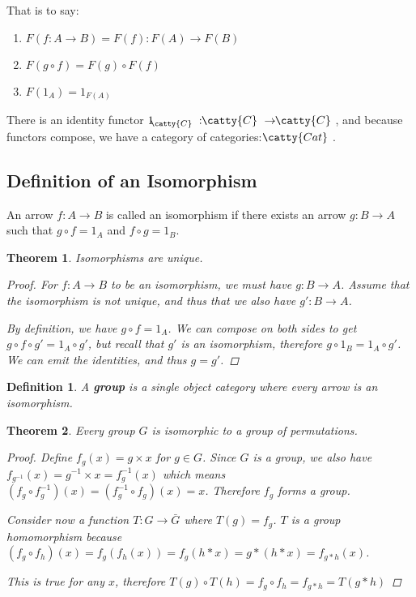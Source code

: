 \documentclass[]{article}
\newtheorem{theorem}{Theorem}
\newtheorem{definition}{Definition}
\newcommand{\tfarr}[4][\to]{\ensuremath{#2 : #3 #1 #4}}
\newcommand{\functor}[3]{\ensuremath{#1 : \cat{#2} \to \cat{#3}}}
\newcommand{\cat}[1]{\ensuremath{\!\! \catty{#1} \,\,}}
\begin{document}
That is to say:

\begin{enumerate}
  \item{$F(\tfarr{f}{A}{B}) = \tfarr{F(f)}{F(A)}{F(B)}$}
  \item{$F(g\circ f) = F(g) \circ F(f)$}
  \item{$F(1_A) = 1_{F(A)}$}
\end{enumerate}

There is an identity functor \functor{1_{\cat{C}}}{C}{C}, and because functors
compose, we have a category of categories: \cat{Cat}.

\subsection{Definition of an Isomorphism}

An arrow \tfarr{f}{A}{B} is called an isomorphism if there exists an arrow
\tfarr{g}{B}{A} such that $g \circ f = 1_A$ and $f \circ g = 1_B$.

\begin{theorem}
Isomorphisms are unique.
\begin{proof}
  For \tfarr{f}{A}{B} to be an isomorphism, we must have \tfarr{g}{B}{A}. Assume
  that the isomorphism is not unique, and thus that we also have
  \tfarr{g'}{B}{A}.

  By definition, we have $g \circ f = 1_A$. We can compose on both sides to get
  $g \circ f \circ g' = 1_A \circ g'$, but recall that $g'$ is an isomorphism,
  therefore $g \circ 1_B = 1_A \circ g'$. We can emit the identities, and thus
  $g = g'$.
\end{proof}
\end{theorem}

\begin{definition}
  A \textbf{group} is a single object category where every arrow is an
  isomorphism.
\end{definition}

\begin{theorem}
Every group $G$ is isomorphic to a group of permutations.
\begin{proof}
  Define $f_g(x) = g \times x$ for $g \in G$. Since $G$ is a group, we also have
  $f_{g^{-1}}(x) = g^{-1} \times x = f_g^{-1}(x)$ which means $(f_g \circ
  f_g^{-1})(x) = (f_g^{-1} \circ f_g)(x) = x$. Therefore $f_g$ forms a group.

  Consider now a function $\tfarr{T}{G}{\bar{G}}$ where $T(g) = f_g$.  $T$ is a
  group homomorphism because $(f_g \circ f_h)(x) = f_g(f_h(x)) = f_g(h * x) = g
  * (h * x) = f_{g*h}(x)$.

  This is true for any $x$, therefore $T(g) \circ T(h) = f_g \circ f_h = f_{g*h}
  = T(g * h)$
\end{proof}
\end{theorem}
\end{document}

